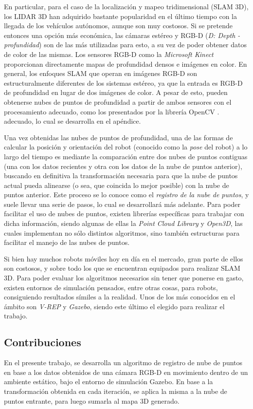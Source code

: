\ifimagenes
En particular, para el caso de la localización y mapeo tridimensional (SLAM 3D), los LIDAR 3D han adquirido bastante popularidad en el último tiempo con la llegada de los vehículos autónomos, aunque son muy costosos. Si se pretende entonces una opción más económica, las cámaras estéreo y RGB-D (\textit{D: Depth - profundidad}) son de las más utilizadas para esto, a su vez de poder obtener datos de color de las mismas. Los sensores RGB-D como la \textit{Microsoft Kinect} proporcionan directamente mapas de profundidad densos e imágenes en color. En general, los enfoques SLAM que operan en imágenes RGB-D son estructuralmente diferentes de los sistemas estéreo, ya que la entrada es RGB-D de profundidad en lugar de dos imágenes de color. A pesar de esto, pueden obtenerse nubes de puntos de profundidad a partir de ambos sensores con el procesamiento
\ifimagenespaper
adecuado, como los presentados por la librería OpenCV \cite{kaehler2017}.
\else
adecuado, lo cual se desarrolla en el apéndice.
\fi

Una vez obtenidas las nubes de puntos de profundidad, una de las formas de calcular la posición y orientación del robot (conocido como la \textit{pose} del robot) a lo largo del tiempo es mediante la comparación entre dos nubes de puntos contiguas (una con los datos recientes y otra con los datos de la nube de puntos anterior), buscando en definitiva la transformación necesaria para que la nube de puntos actual pueda alinearse (o sea, que coincida lo mejor posible) con la nube de puntos anterior. Este proceso se lo conoce como el \textit{registro de la nube de puntos}, y suele llevar una serie de pasos, lo cual se desarrollará más adelante. Para poder facilitar el uso de nubes de puntos, existen librerías específicas para trabajar con dicha información, siendo algunas de ellas la \textit{Point Cloud Library} y \textit{Open3D}, las cuales implementan no sólo distintos algoritmos, sino también estructuras para facilitar el manejo de las nubes de puntos.

Si bien hay muchos robots móviles hoy en día en el mercado, gran parte de ellos son costosos, y sobre todo los que se encuentran equipados para realizar SLAM 3D. Para poder evaluar los algoritmos necesarios sin tener que ponerse en gasto, existen entornos de simulación pensados, entre otras cosas, para robots, consiguiendo resultados símiles a la realidad. Unos de los más conocidos en el ámbito son \textit{V-REP} y \textit{Gazebo}, siendo este último el elegido para realizar el trabajo.

\subsection{Contribuciones}
En el presente trabajo, se desarrolla un algoritmo de registro de nube de puntos en base a los datos obtenidos de una cámara RGB-D en movimiento dentro de un ambiente estático, bajo el entorno de simulación Gazebo. En base a la transformación obtenida en cada iteración, se aplica la misma a la nube de puntos entrante, para luego sumarla al mapa 3D generado.

